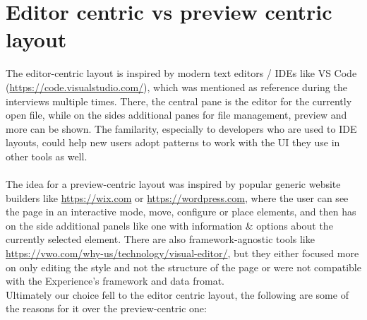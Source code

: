 \section{Editor centric vs preview centric layout}
The editor-centric layout is inspired by modern text editors / IDEs like VS Code (\url{https://code.visualstudio.com/}), which was mentioned as reference during the interviews multiple times.
There, the central pane is the editor for the currently open file, while on the sides additional panes for file management, preview and more can be shown.
The familarity, especially to developers who are used to IDE layouts, could help new users adopt patterns to work with the UI they use in other tools as well.
\\\\
The idea for a preview-centric layout was inspired by popular generic website builders like \url{https://wix.com} or \url{https://wordpress.com}, where the user
can see the page in an interactive mode, move, configure or place elements, and then has on the side additional panels like one with information \& options about the
currently selected element.
There are also framework-agnostic tools like \url{https://vwo.com/why-us/technology/visual-editor/}, but they either focused more on only editing the style and not the structure of the page or were not
compatible with the Experience's framework and data fromat. 
\\
Ultimately our choice fell to the editor centric layout, the following are some of the reasons for it over the preview-centric one:
